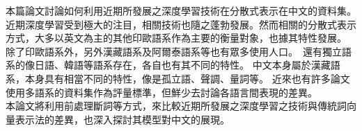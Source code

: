 \begin{abstractCH}

本篇論文討論如何利用近期所發展之深度學習技術在分散式表示在中文的資料集。 \\

近期深度學習受到極大的注目，相關技術也隨之蓬勃發展。然而相關的分散式表示方式，大多以英文為主的其他印歐語系作為主要的衡量對象，也據其特性發展。 
除了印歐語系外，另外漢藏語系及阿爾泰語系等也有眾多使用人口。　還有獨立語系的像日語、韓語等語系存在，各自也有其不同的特性。
中文本身屬於漢藏語系，本身具有相當不同的特性，像是孤立語、聲調、量詞等。
近來也有許多論文使用多語系的資料集作為評量標準，但鮮少去討論各語言間表現的差異。\\

本論文將利用前處理斷詞等方式，來比較近期所發展之深度學習之技術與傳統詞向量表示法的差異，也深入探討其模型對中文的展現。

\end{abstractCH}

